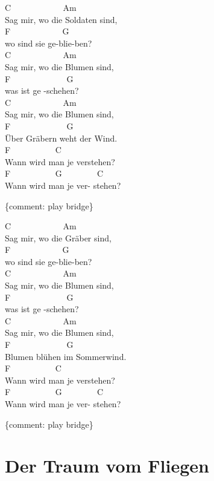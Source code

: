 \documentclass[
  letterpaper,
  twoside=false]{scrbook}
\begin{document}
C ~ ~ ~ ~ ~ ~ ~ Am ~ ~ ~ ~ ~\\
Sag mir, wo die Soldaten sind,\\
F ~ ~ ~ ~ ~ ~ ~ G\\
wo sind sie ge-blie-ben?\\
C ~ ~ ~ ~ ~ ~ ~ Am ~ ~ ~ ~ ~\\
Sag mir, wo die Blumen sind,\\
F ~ ~ ~ ~ ~ ~ ~ ~G\\
was ist ge -schehen?\\
C ~ ~ ~ ~ ~ ~ ~ Am ~ ~ ~ ~ ~\\
Sag mir, wo die Blumen sind,\\
F ~ ~ ~ ~ ~ ~ ~ ~G\\
Über Gräbern weht der Wind.\\
F ~ ~ ~ ~ ~ ~ C ~ ~ ~ ~ ~ ~ ~ ~\\
Wann wird man je verstehen? ~ ~\\
F ~ ~ ~ ~ ~ ~ G ~ ~ ~ ~ ~C\\
Wann wird man je ver- stehen?

\{comment: play bridge\}

C ~ ~ ~ ~ ~ ~ ~ Am ~ ~ ~ ~ ~\\
Sag mir, wo die Gräber sind,\\
F ~ ~ ~ ~ ~ ~ ~ G\\
wo sind sie ge-blie-ben?\\
C ~ ~ ~ ~ ~ ~ ~ Am ~ ~ ~ ~ ~\\
Sag mir, wo die Blumen sind,\\
F ~ ~ ~ ~ ~ ~ ~ ~G\\
was ist ge -schehen?\\
C ~ ~ ~ ~ ~ ~ ~ Am ~ ~ ~ ~ ~\\
Sag mir, wo die Blumen sind,\\
F ~ ~ ~ ~ ~ ~ ~ ~G\\
Blumen blühen im Sommerwind.\\
F ~ ~ ~ ~ ~ ~ C ~ ~ ~ ~ ~ ~ ~ ~\\
Wann wird man je verstehen? ~ ~\\
F ~ ~ ~ ~ ~ ~ G ~ ~ ~ ~ ~C\\
Wann wird man je ver- stehen?

\{comment: play bridge\}

\hypertarget{der-traum-vom-fliegen}{%
\chapter{Der Traum vom Fliegen}\label{der-traum-vom-fliegen}}
\end{document}
